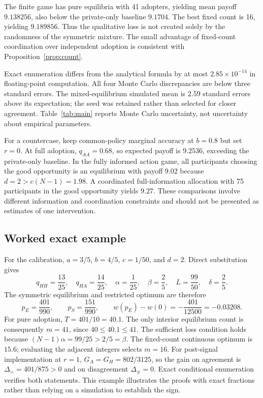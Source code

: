 \documentclass[11pt,a4paper]{article}
\theoremstyle{definition}
\theoremstyle{remark}
\begin{document}
The finite game has pure equilibria with 41 adopters, yielding mean payoff $9.138256$, also below the private-only baseline $9.1704$. The best fixed count is 16, yielding $9.189856$. Thus the qualitative loss is not created solely by the randomness of the symmetric mixture. The small advantage of fixed-count coordination over independent adoption is consistent with Proposition~\ref{prop:count}.

Exact enumeration differs from the analytical formula by at most $2.85\times10^{-14}$ in floating-point computation. All four Monte Carlo discrepancies are below three standard errors. The mixed-equilibrium simulated mean is 2.59 standard errors above its expectation; the seed was retained rather than selected for closer agreement. Table~\ref{tab:main} reports Monte Carlo uncertainty, not uncertainty about empirical parameters.

For a countercase, keep common-policy marginal accuracy at $b=0.8$ but set $r=0$. At full adoption, $q_{AA}=0.68$, so expected payoff is $9.2536$, exceeding the private-only baseline. In the fully informed action game, all participants choosing the good opportunity is an equilibrium with payoff $9.02$ because $d=2>c(N-1)=1.98$. A coordinated full-information allocation with 75 participants in the good opportunity yields $9.27$. These comparisons involve different information and coordination constraints and should not be presented as estimates of one intervention.


\subsection{Worked exact example}
For the calibration, $a=3/5$, $b=4/5$, $c=1/50$, and $d=2$. Direct substitution gives
\[
 q_{HH}=\frac{13}{25},\quad q_{HA}=\frac{14}{25},\quad
 \alpha=\frac1{25},\quad\beta=\frac25,\quad
 L=\frac{99}{50},\quad\delta=\frac25.
\]
The symmetric equilibrium and restricted optimum are therefore
\[
 p_E=\frac{401}{990},\qquad p_S=\frac{151}{990},\qquad
 w(p_E)-w(0)=-\frac{401}{12500}=-0.03208.
\]
For pure adoption, $T=401/10=40.1$. The only interior equilibrium count is consequently $m=41$, since $40\leq40.1\leq41$. The sufficient loss condition holds because $(N-1)\alpha=99/25>2/5=\beta$. The fixed-count continuous optimum is $15.6$; evaluating the adjacent integers selects $m=16$. For post-signal implementation at $r=1$, $G_A=G_H=802/3125$, so the gain on agreement is $\Delta_{=}=401/875>0$ and on disagreement $\Delta_{\ne}=0$. Exact conditional enumeration verifies both statements. This example illustrates the proofs with exact fractions rather than relying on a simulation to establish the sign.
\end{document}
